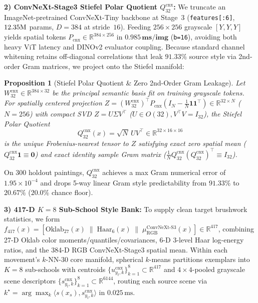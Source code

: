 \documentclass[conference]{IEEEtran}
\newtheorem{proposition}{Proposition}
\newcommand{\R}{\mathbb{R}}
\begin{document}
\textbf{2) ConvNeXt-Stage3 Stiefel Polar Quotient $Q_{32}^{\mathrm{cnx}}$:}
We truncate an ImageNet-pretrained ConvNeXt-Tiny backbone at Stage~3 (\texttt{features[:6]}, $12.35\text{M}$ params, $D=384$ at stride~$16$). Feeding $256\times 256$ grayscale $[Y,Y,Y]$ yields spatial tokens $P_{\mathrm{cnx}}\in\R^{384\times 256}$ in $\mathbf{0.985\,\text{ms/img}}$ (\texttt{b=16}), avoiding both heavy ViT latency and DINOv2 evaluator coupling. Because standard channel whitening retains off-diagonal correlations that leak $91.33\%$ source style via 2nd-order Gram matrices, we project onto the Stiefel manifold:

\begin{proposition}[Stiefel Polar Quotient \& Zero 2nd-Order Gram Leakage]
\label{prop:stiefel}
Let $W_{32}^{\mathrm{cnx}} \in \R^{384\times 32}$ be the principal semantic basis fit on training grayscale tokens. For spatially centered projection $Z = (W_{32}^{\mathrm{cnx}})^\top P_{\mathrm{cnx}}(I_N - \frac{1}{N}\mathbf{1}\mathbf{1}^\top) \in \R^{32\times N}$ ($N=256$) with compact SVD $Z = U \Sigma V^\top$ ($U\in O(32), V^\top V = I_{32}$), the Stiefel Polar Quotient
\begin{equation}
Q_{32}^{\mathrm{cnx}}(x) = \sqrt{N}\, U V^\top \in \R^{32\times 16\times 16}
\label{eq:stiefel-q}
\end{equation}
is the unique Frobenius-nearest tensor to $Z$ satisfying exact zero spatial mean ($Q_{32}^{\mathrm{cnx}}\mathbf{1} \equiv \mathbf{0}$) and exact identity sample Gram matrix ($\frac{1}{N} Q_{32}^{\mathrm{cnx}} (Q_{32}^{\mathrm{cnx}})^\top \equiv I_{32}$).
\end{proposition}
On 300 holdout paintings, $Q_{32}^{\mathrm{cnx}}$ achieves a max Gram numerical error of $1.95\times 10^{-4}$ and drops 5-way linear Gram style predictability from $91.33\%$ to $\mathbf{20.67\%}$ ($20.0\%$ chance floor).

\textbf{3) 417-D $K=8$ Sub-School Style Bank:}
To supply clean target brushwork statistics, we form $f_{417}(x) = [\text{Oklab}_{27}(x) \;\|\; \text{Haar}_{6}(x) \;\|\; \mu_{\mathrm{RGB}}^{\mathrm{ConvNeXt\text{-}S3}}(x)] \in \R^{417}$, combining 27-D Oklab color moments/quantiles/covariances, 6-D 3-level Haar log-energy ratios, and the 384-D RGB ConvNeXt-Stage3 spatial mean. Within each movement's $k$-NN-30 core manifold, spherical $k$-means partitions exemplars into $K=8$ sub-schools with centroids $\{u_{y_t,k}^{\mathrm{cnx}}\}_{k=1}^8 \subset \R^{417}$ and $4\times 4$-pooled grayscale scene descriptors $\{s_{y_t,k}^{\mathrm{cnx}}\}_{k=1}^8 \subset \R^{6144}$, routing each source scene via $k^\star = \arg\max_k \langle s(x_s), s_{y_t,k}^{\mathrm{cnx}}\rangle$ in $0.025\,\text{ms}$.
\end{document}
